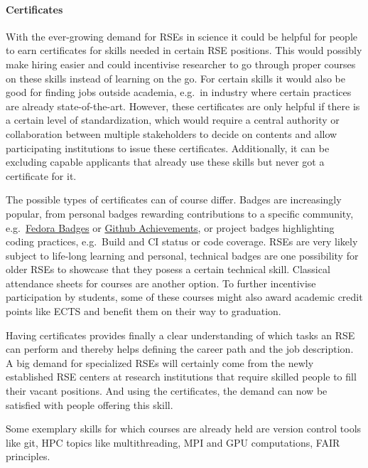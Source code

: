 \documentclass[a4paper
]{article}
\begin{document}
\hypertarget{certificates}{%
\paragraph{Certificates}\label{certificates}}

With the ever-growing demand for RSEs in science it could be helpful for
people to earn certificates for skills needed in certain RSE positions.
This would possibly make hiring easier and could incentivise researcher
to go through proper courses on these skills instead of learning on the
go. For certain skills it would also be good for finding jobs outside
academia, e.g.~in industry where certain practices are already
state-of-the-art. However, these certificates are only helpful if there
is a certain level of standardization, which would require a central
authority or collaboration between multiple stakeholders to decide on
contents and allow participating institutions to issue these
certificates. Additionally, it can be excluding capable applicants that
already use these skills but never got a certificate for it.

The possible types of certificates can of course differ. Badges are
increasingly popular, from personal badges rewarding contributions to a
specific community,
e.g.~\href{https://badges.fedoraproject.org/explore/badges}{Fedora
Badges} or
\href{https://github.com/Schweinepriester/github-profile-achievements}{Github
Achievements}, or project badges highlighting coding practices,
e.g.~Build and CI status or code coverage. RSEs are very likely subject
to life-long learning and personal, technical badges are one possibility
for older RSEs to showcase that they posess a certain technical skill.
Classical attendance sheets for courses are another option. To further
incentivise participation by students, some of these courses might also
award academic credit points like ECTS and benefit them on their way to
graduation.

Having certificates provides finally a clear understanding of which
tasks an RSE can perform and thereby helps defining the career path and
the job description. A big demand for specialized RSEs will certainly
come from the newly established RSE centers at research institutions
that require skilled people to fill their vacant positions. And using
the certificates, the demand can now be satisfied with people offering
this skill.

Some exemplary skills for which courses are already held are version
control tools like git, HPC topics like multithreading, MPI and GPU
computations, FAIR principles.
\end{document}
